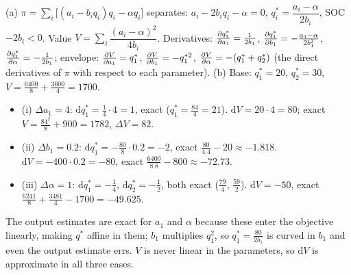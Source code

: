 \begin{solutions}
  \item (a) $\pi=\sum_i\bigl[(a_i-b_iq_i)q_i-\alpha q_i\bigr]$ separates:
        $a_i-2b_iq_i-\alpha=0$, $q_i^*=\dfrac{a_i-\alpha}{2b_i}$, SOC
        $-2b_i<0$. Value $V=\sum_i\dfrac{(a_i-\alpha)^{2}}{4b_i}$.
        Derivatives: $\frac{\partial q_1^*}{\partial a_1}=\tfrac{1}{2b_1}$,
        $\frac{\partial q_1^*}{\partial b_1}=-\tfrac{a_1-\alpha}{2b_1^{2}}$,
        $\frac{\partial q_1^*}{\partial \alpha}=-\tfrac1{2b_1}$; envelope: $\frac{\partial V}{\partial a_1}=q_1^*$,
        $\frac{\partial V}{\partial b_1}=-q_1^{*2}$, $\frac{\partial V}{\partial \alpha}=-(q_1^*+q_2^*)$ (the direct
        derivatives of $\pi$ with respect to each parameter).
        (b) Base: $q_1^*=20$, $q_2^*=30$, $V=\tfrac{6400}{8}+\tfrac{3600}{4}=1700$.
        \begin{itemize}
          \item (i) $\Delta a_1=4$: $\mathrm{d}q_1^*=\tfrac14\cdot4=1$, exact
                ($q_1^*=\tfrac{84}{4}=21$). $\mathrm{d}V=20\cdot4=80$;
                exact $V=\tfrac{84^{2}}{8}+900=1782$, $\Delta V=82$.
          \item (ii) $\Delta b_1=0.2$: $\mathrm{d}q_1^*=-\tfrac{80}{8}\cdot0.2=-2$,
                exact $\tfrac{80}{4.4}-20\approx-1.818$.
                $\mathrm{d}V=-400\cdot0.2=-80$, exact
                $\tfrac{6400}{8.8}-800\approx-72.73$.
          \item (iii) $\Delta\alpha=1$: $\mathrm{d}q_1^*=-\tfrac14$,
                $\mathrm{d}q_2^*=-\tfrac12$, both exact
                ($\tfrac{79}{4}$, $\tfrac{59}{2}$). $\mathrm{d}V=-50$, exact
                $\tfrac{6241}{8}+\tfrac{3481}{4}-1700=-49.625$.
        \end{itemize}
        The output estimates are exact for $a_1$ and $\alpha$ because these
        enter the objective linearly, making $q^*$ affine in them; $b_1$
        multiplies $q_1^{2}$, so $q_1^*=\tfrac{80}{2b_1}$ is curved in $b_1$
        and even the output estimate errs. $V$ is never linear in the
        parameters, so $\mathrm{d}V$ is approximate in all three cases.


\end{solutions}
